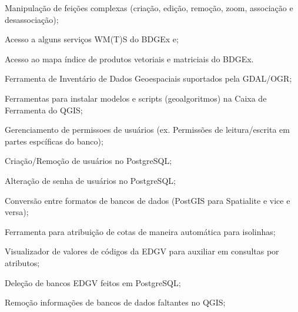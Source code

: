 Manipulação de feições complexas (criação, edição, remoção, zoom, associação e desassociação);

Acesso a alguns serviços W\+M(\+T)S do B\+D\+G\+Ex e;

Acesso ao mapa índice de produtos vetoriais e matriciais do B\+D\+G\+Ex.

Ferramenta de Inventário de Dados Geoespaciais suportados pela G\+D\+A\+L/\+O\+GR;

Ferramentas para instalar modelos e scripts (geoalgoritmos) na Caixa de Ferramenta do Q\+G\+IS;

Gerenciamento de permissoes de usuários (ex. Permissões de leitura/escrita em partes espcíficas do banco);

Criação/\+Remoção de usuários no Postgre\+S\+QL;

Alteração de senha de usuários no Postgre\+S\+QL;

Conversão entre formatos de bancos de dados (Post\+G\+IS para Spatialite e vice e versa);

Ferramenta para atribuição de cotas de maneira automática para isolinhas;

Visualizador de valores de códigos da E\+D\+GV para auxiliar em consultas por atributos;

Deleção de bancos E\+D\+GV feitos em Postgre\+S\+QL;

Remoção informações de bancos de dados faltantes no Q\+G\+IS; 